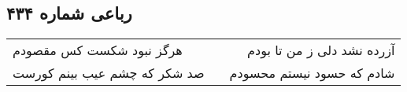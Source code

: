 \begin{center}
\section*{رباعی شماره ۴۳۴}
\label{sec:sh434}
\begin{longtable}{l p{0.5cm} r}
هرگز نبود شکست کس مقصودم
&&
آزرده نشد دلی ز من تا بودم
\\
صد شکر که چشم عیب بینم کورست
&&
شادم که حسود نیستم محسودم
\\
\end{longtable}
\end{center}
